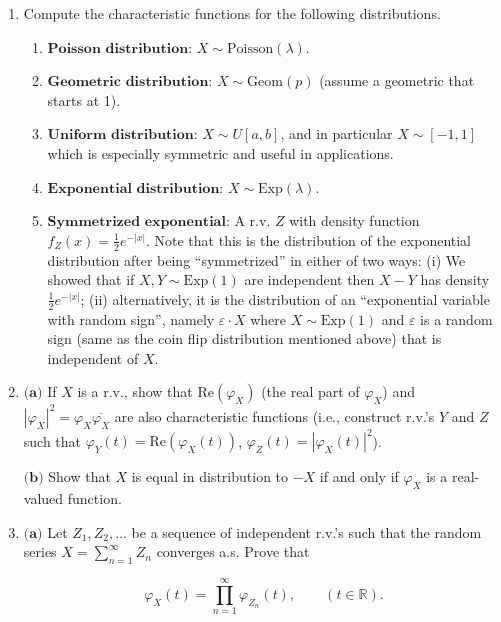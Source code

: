 \documentclass[11pt]{report}
\newcommand{\R}{\mathbb{R}}
\theoremstyle{plain}
\theoremstyle{definition}
\begin{document}
\begin{enumerate}[label=\arabic*.]
\item Compute the characteristic functions for the
following distributions.

\begin{enumerate}[label=(\alph*)]
\item $\textbf{Poisson distribution:}$
$X\sim \textrm{Poisson}(\lambda)$.

\item $\textbf{Geometric distribution:}$
$X\sim \textrm{Geom}(p)$ (assume a geometric that
starts at 1).

\item $\textbf{Uniform distribution:}$ $X \sim U[a,b]$, and
in particular $X\sim [-1,1]$ which is especially
symmetric and useful in applications.

\item $\textbf{Exponential distribution:}$
$X\sim \textrm{Exp}(\lambda)$.

\item $\textbf{Symmetrized exponential:}$ A r.v. $Z$ with
density function $f_Z(x) = \frac12 e^{-|x|}$. Note
that this is the distribution of the exponential
distribution after being ``symmetrized'' in either of
two ways: (i) We showed that if
$X,Y\sim \textrm{Exp}(1)$ are independent then $X-Y$
has density $\frac12 e^{-|x|}$; (ii) alternatively,
it is the distribution of an ``exponential variable
with random sign'', namely $\varepsilon\cdot X$ where
$X\sim \textrm{Exp}(1)$ and $\varepsilon$ is a random
sign (same as the coin flip distribution mentioned
above) that is independent of $X$.
\end{enumerate}

\item $\textbf{(a)}$ If $X$ is a r.v., show that
$\textrm{Re}(\varphi_X)$ (the real part of
$\varphi_X$) and
$|\varphi_X|^2 = \varphi_X \overline{\varphi_X}$ are
also characteristic functions (i.e., construct r.v.'s
$Y$ and $Z$ such that
$\varphi_Y(t) = \textrm{Re}(\varphi_X(t))$,
$\varphi_Z(t) = |\varphi_X(t)|^2$).

$\textbf{(b)}$ Show that $X$ is equal in distribution
to $-X$ if and only if $\varphi_X$ is a real-valued
function.

\item $\textbf{(a)}$ Let $Z_1,Z_2,\ldots$ be a sequence of
independent r.v.'s such that the random series
$X = \sum_{n=1}^\infty Z_n$ converges a.s. Prove that

\[
\varphi_X(t) = \prod_{n=1}^\infty \varphi_{Z_n}(t), \qquad (t\in \R).
\]


\end{enumerate}
\end{document}
